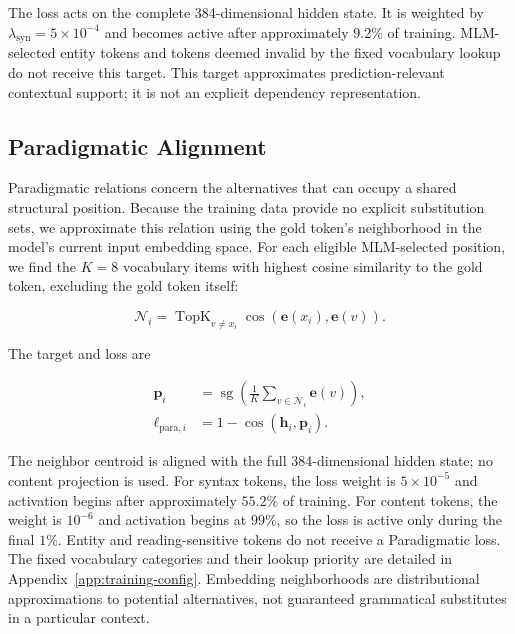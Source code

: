 \documentclass[11pt,a4paper]{article}
\begin{document}
The loss acts on the complete 384-dimensional hidden state. It is
weighted by $\lambda_{\mathrm{syn}}=5\times10^{-4}$ and becomes active
after approximately $9.2\%$ of training. MLM-selected entity tokens
and tokens deemed invalid by the fixed vocabulary lookup do not
receive this target. This target approximates prediction-relevant
contextual support; it is not an explicit dependency representation.

\subsection{Paradigmatic Alignment}
\label{sec:paradigmatic}

Paradigmatic relations concern the alternatives that can occupy a
shared structural position. Because the training data provide no
explicit substitution sets, we approximate this relation using the
gold token's neighborhood in the model's current input embedding
space. For each eligible MLM-selected position, we find the $K=8$
vocabulary items with highest cosine similarity to the gold token,
excluding the gold token itself:

\begin{equation}
\mathcal{N}_i =
\operatorname{TopK}_{v\neq x_i}
\cos\left(\mathbf{e}(x_i),\mathbf{e}(v)\right).
\label{eq:paradigmatic_neighbors}
\end{equation}

The target and loss are

\begin{align}
\mathbf{p}_i & =
\operatorname{sg}\!\left(
\frac{1}{K}\sum_{v\in\mathcal{N}_i}\mathbf{e}(v)
\right),
\label{eq:paradigmatic_target}\\
\ell_{\mathrm{para},i} & =
1-\cos(\mathbf{h}_i,\mathbf{p}_i).
\label{eq:paradigmatic_alignment}
\end{align}

The neighbor centroid is aligned with the full 384-dimensional hidden
state; no content projection is used. For syntax tokens, the loss
weight is $5\times10^{-5}$ and activation begins after approximately
$55.2\%$ of training. For content tokens, the weight is $10^{-6}$ and
activation begins at $99\%$, so the loss is active only during the
final $1\%$. Entity and reading-sensitive tokens do not receive a
Paradigmatic loss. The fixed vocabulary categories and their lookup
priority are detailed in Appendix~\ref{app:training-config}.
Embedding neighborhoods are distributional approximations to
potential alternatives, not guaranteed grammatical substitutes in a
particular context.
\end{document}
